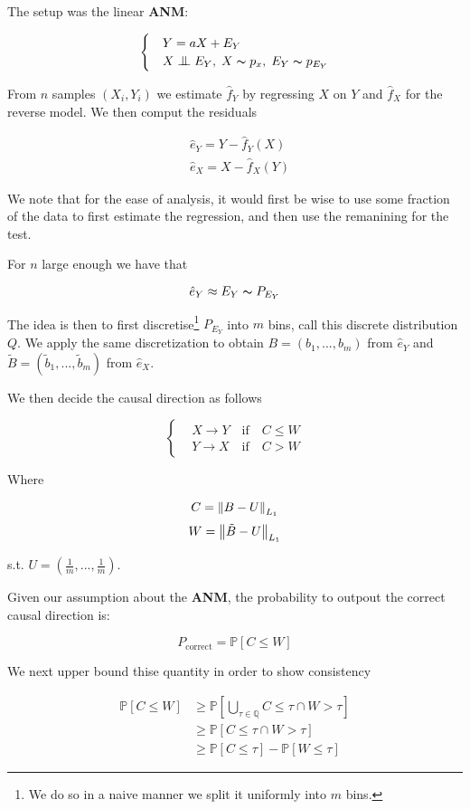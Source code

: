 The setup was the linear \textbf{ANM}:

\[ \begin{cases} 
    & Y = aX + E_Y  \\
    & X \bigCI E_Y,\; X \thicksim p_x,\; E_Y \thicksim p_{E_Y}  
 \end{cases}
\]

From $n$ samples $(X_i, Y_i)$ we estimate $\hat{f}_Y$ by regressing $X$ on $Y$ and 
$\hat{f}_X$ for the reverse model. We then comput the residuals

\begin{align}
    &  \hat{e}_Y = Y - \hat{f}_Y(X)\\
    &  \hat{e}_X = X - \hat{f}_X(Y)
\end{align}

We note that for the ease of analysis, it would first be wise to use some fraction 
of the data to first estimate the regression, and then use the remanining for the test.

For $n$ large enough we have that 

$$
    \hat{e}_Y \approx E_Y \thicksim P_{E_Y}
$$

The idea is then to first discretise\footnote{We do so in a naive manner we split
it uniformly into $m$ bins.} $P_{E_Y}$ into $m$ bins, call this discrete distribution
$Q$. We apply the same discretization to obtain $B = (b_1, ..., b_m)$ from $\hat{e}_Y$
and $\tilde{B} = (\tilde{b}_1, ..., \tilde{b}_m)$ from $\hat{e}_X$.

We then decide the causal direction as follows

\[ \begin{cases} 
    & X \rightarrow Y \quad \text{if} \quad C \leq W  \\
    & Y \rightarrow X \quad \text{if} \quad C > W  
 \end{cases}
\]

Where 

$$
    C = \left\lVert B - U\right\rVert_{L_1} 
$$
$$
    W = \left\lVert\tilde{B} - U\right\rVert_{L_1}
$$


s.t. $U = (\frac{1}{m}, ..., \frac{1}{m})$.

Given our assumption about the \textbf{ANM}, the probability to outpout the correct causal direction is:

$$
   P_{\text{correct}} = \mathbb{P}\left[C \leq W\right] 
$$

We next upper bound thise quantity in order to show consistency

\begin{align}
    \mathbb{P}\left[C \leq W\right] &\geq \mathbb{P}\left[ \underset{\tau \in \mathbb{Q}}{\bigcup} C \leq \tau \cap W > \tau \right] \\
    &\geq \mathbb{P}\left[C \leq \tau \cap W > \tau \right] \\
    &\geq \mathbb{P}\left[C \leq \tau \right] - \mathbb{P}\left[W \leq \tau \right]
\end{align}

